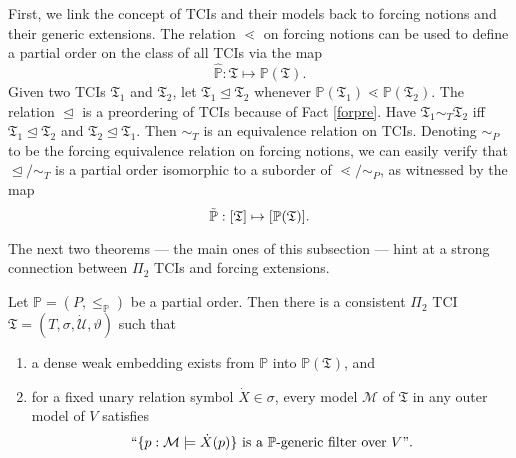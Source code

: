 \documentclass[12pt]{article}
\numberwithin{equation}{section}
\begin{document}
First, we link the concept of TCIs and their models back to forcing notions and their generic extensions. The relation $\lessdot$ on forcing notions can be used to define a partial order on the class of all TCIs via the map 
\begin{equation}\label{pmap}
    \hat{\mathbb{P}} : \mathfrak{T} \mapsto \mathbb{P}(\mathfrak{T}) \text{.}
\end{equation}
Given two TCIs $\mathfrak{T}_1$ and $\mathfrak{T}_2$, let $\mathfrak{T}_1 \trianglelefteq \mathfrak{T}_2$ whenever $\mathbb{P}(\mathfrak{T}_1) \lessdot \mathbb{P}(\mathfrak{T}_2)$. The relation $\trianglelefteq$ is a preordering of TCIs because of Fact \ref{forpre}. Have $\mathfrak{T}_1 \sim_T \mathfrak{T}_2$ iff $\mathfrak{T}_1 \trianglelefteq \mathfrak{T}_2$ and $\mathfrak{T}_2 \trianglelefteq \mathfrak{T}_1$. Then $\sim_T$ is an equivalence relation on TCIs. Denoting $\sim_P$ to be the forcing equivalence relation on forcing notions, we can easily verify that $\trianglelefteq / \sim_T$ is a partial order isomorphic to a suborder of $\lessdot / \sim_P$, as witnessed by the map 
\begin{equation}\label{peqmap}
    \Tilde{\mathbb{P}}: [\mathfrak{T}] \mapsto [\mathbb{P}(\mathfrak{T})] \text{.}
\end{equation}

The next two theorems --- the main ones of this subsection --- hint at a strong connection between $\Pi_2$ TCIs and forcing extensions.

\begin{thm}\label{revgenmodels}
Let $\mathbb{P} = (P, \leq_{\mathbb{P}})$ be a partial order. Then there is a consistent $\Pi_2$ TCI $\mathfrak{T} = (T, \sigma, \dot{\mathcal{U}}, \vartheta)$ such that
\begin{enumerate}[label=(\alph*)]
    \item a dense weak embedding exists from $\mathbb{P}$ into $\mathbb{P}(\mathfrak{T})$, and
    \item for a fixed unary relation symbol $\dot{X} \in \sigma$, every model $\mathcal{M}$ of $\mathfrak{T}$ in any outer model of $V$ satisfies $$``\{p : \mathcal{M} \models \dot{X}(p)\} \text{ is a } \mathbb{P} \text{-generic filter over } V" \text{.}$$
\end{enumerate}
\end{thm}
\end{document}
